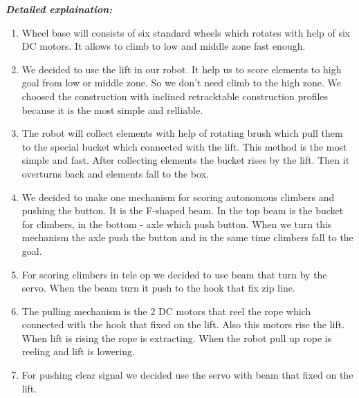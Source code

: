 \newline
\textit{\textbf{Detailed explaination:}}
\begin{enumerate}
	\item Wheel base will consists of six standard wheels which rotates with help of six DC motors. It allows to climb to low and middle zone fast enough.
	
	\item We decided to use the lift in our robot. It help us to score elements to high goal from low or middle zone. So we don't need climb to the high zone. We choosed the construction with inclined retracktable construction profiles because it is the most simple and relliable.
	
	\item The robot will collect elements with help of rotating brush which pull them to the special bucket which connected with the lift. This method is the most simple and fast. After collecting elements the bucket rises by the lift. Then it overturns back and elements fall to the box.
	
	\item We decided to make one mechanism for scoring autonomous climbers and pushing the button. It is the F-shaped beam. In the top beam is the bucket for climbers, in the bottom - axle which push button. When we turn this mechanism the axle push the button and in the same time climbers fall to the goal.
	
	\item For scoring climbers in tele op we decided to use beam that turn by the servo. When the beam turn it push to the hook that fix zip line.
	
	\item The pulling mechanism is the 2 DC motors that reel the rope which connected with the hook that fixed on the lift. Also this motors rise the lift. When lift is rising the rope is extracting. When the robot pull up rope is reeling and lift is lowering. 
	
	\item For pushing clear signal we decided use the servo with beam that fixed on the lift.

	
\end{enumerate}

\newline


\fillpage
